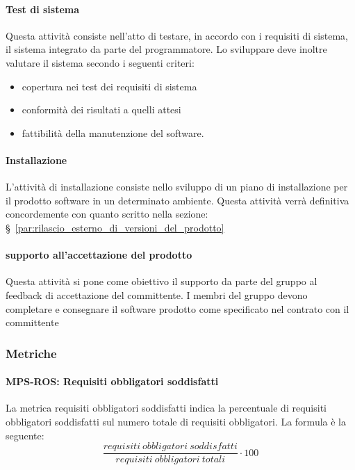 \documentclass[../../norme-di-progetto.tex]{subfiles}
\begin{document}
\paragraph{Test di sistema}%
\label{par:test_sistema}
Questa attività consiste nell'atto di testare, in accordo con i requisiti di sistema, il sistema integrato da parte del programmatore.
Lo sviluppare deve inoltre valutare il sistema secondo i seguenti criteri:
\begin{itemize}
  \item copertura nei test dei requisiti di sistema
  \item conformità dei risultati a quelli attesi
  \item fattibilità della manutenzione del software.
\end{itemize}

\paragraph{Installazione}%
\label{par:installazione}
L'attività di installazione consiste nello sviluppo di un piano di installazione per il prodotto software in un determinato ambiente.
Questa attività verrà definitiva concordemente con quanto scritto nella sezione: §~\ref{par:rilascio_esterno_di_versioni_del_prodotto}

\paragraph{supporto all'accettazione del prodotto}%
\label{par:supporto_accettazione_prodotto}
Questa attività si pone come obiettivo il supporto da parte del gruppo al feedback di accettazione del committente.
I membri del gruppo devono completare e consegnare il software prodotto come specificato nel contrato con il committente

\subsubsection{Metriche}%
\label{subs:sviluppo/metriche}

\paragraph{MPS-ROS: Requisiti obbligatori soddisfatti}%
\label{par:MPS-ROS_requisiti_obbligatori_soddisfatti}

La metrica requisiti obbligatori soddisfatti indica la percentuale di requisiti obbligatori soddisfatti sul numero totale di requisiti obbligatori. La formula è la seguente:
\[
  \frac{requisiti\ obbligatori\ soddisfatti}{requisiti\ obbligatori\ totali}\cdot 100
\]
\end{document}
